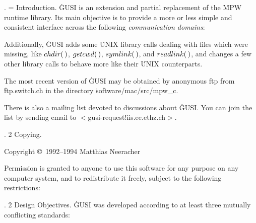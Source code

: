 . = Introduction.  \.{GUSI} is an extension and partial replacement of the
\.{MPW} runtime library. Its main objective is to provide a more or less simple
and consistent interface across the following {\it communication domains}:

\medskip{}

\medskip
Additionally, \.{GUSI} adds some \.{UNIX} library calls dealing with files
which
were missing, like \CD{}$\\{chdir}(\,)$\DC{}, \CD{}$\\{getcwd}(\,)$\DC{}, %
\CD{}$\\{symlink}(\,)$\DC{}, and \CD{}$\\{readlink}(\,)$\DC{}, and
changes a few other library calls to behave more like their \.{UNIX}
counterparts.

The most recent version of \.{GUSI} may be obtained by anonymous ftp from
\.{ftp.switch.ch} in the directory \.{software/mac/src/mpw\_c}.

There is also a mailing list devoted to discussions about \.{GUSI}. You can
join the
list by sending email to $<$gusi-request\AT!iis.ee.ethz.ch$>$.

\fi

. 2 Copying.

\medskip Copyright \copyright\ 1992--1994 Matthias Neeracher

\medskip Permission is granted to anyone to use this software for any
purpose on any computer system, and to redistribute it freely,
subject to the following restrictions:

\medskip{}

\fi

. 2 Design Objectives. \.{GUSI} was developed according to at least three
mutually conflicting standards:

